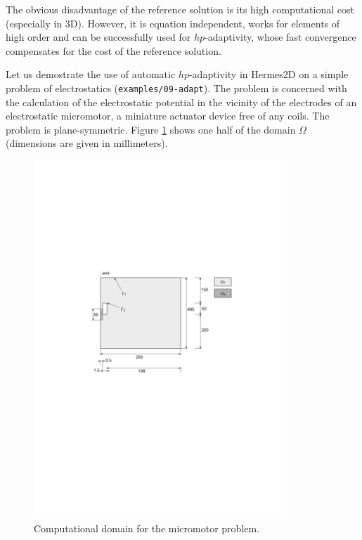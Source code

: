 The obvious disadvantage of the reference solution is its high computational cost (especially
in 3D). However, it is equation independent, works for elements of high order and can be
successfully used for $hp$-adaptivity, whose fast convergence compensates for the cost
of the reference solution.

Let us demostrate the use of automatic $hp$-adaptivity in Hermes2D on a simple problem of
electrostatics ({\tt examples/09-adapt}). The problem is concerned with the calculation of
the electrostatic potential in the vicinity of the electrodes of an electrostatic micromotor,
a miniature actuator device free of any coils. The problem is plane-symmetric.
Figure \ref{fig:micromotor} shows one half of the domain $\Omega$
(dimensions are given in millimeters).

\begin{figure}[ht]
  \medskip \centering
  \includegraphics[width=0.85\textwidth]{img/micromotor}
  \caption{Computational domain for the micromotor problem.}
  \label{fig:micromotor}
\end{figure}

